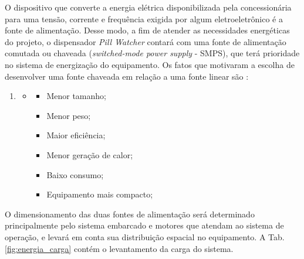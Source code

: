  O dispositivo que converte a energia elétrica disponibilizada pela concessionária para uma tensão, corrente e frequência exigida por algum eletroeletrônico é a fonte de alimentação. Desse modo, a fim de atender as necessidades energéticas do projeto, o dispensador \textit{Pill Watcher} contará com uma fonte de alimentação comutada ou chaveada (\textit{switched-mode power supply} - SMPS), que terá prioridade no sistema de energização do equipamento. Os fatos que motivaram a escolha de desenvolver uma fonte chaveada em relação a uma fonte linear são \cite{Projeto_fonte}:
 
 \begin{enumerate}
    \item[ ]
    \begin{itemize}
        \item[ ]
        \begin{itemize}
            \item Menor tamanho;
            \item Menor peso;
            \item Maior eficiência;
            \item Menor geração de calor;
            \item Baixo consumo;
            \item Equipamento mais compacto;
        \end{itemize}
    \end{itemize}
\end{enumerate}

O dimensionamento das duas fontes de alimentação será determinado principalmente pelo sistema embarcado e motores que atendam ao sistema de operação, e levará em conta sua distribuição espacial no equipamento. A Tab. \ref{fig:energia_carga} contém o levantamento da carga do sistema.

 
